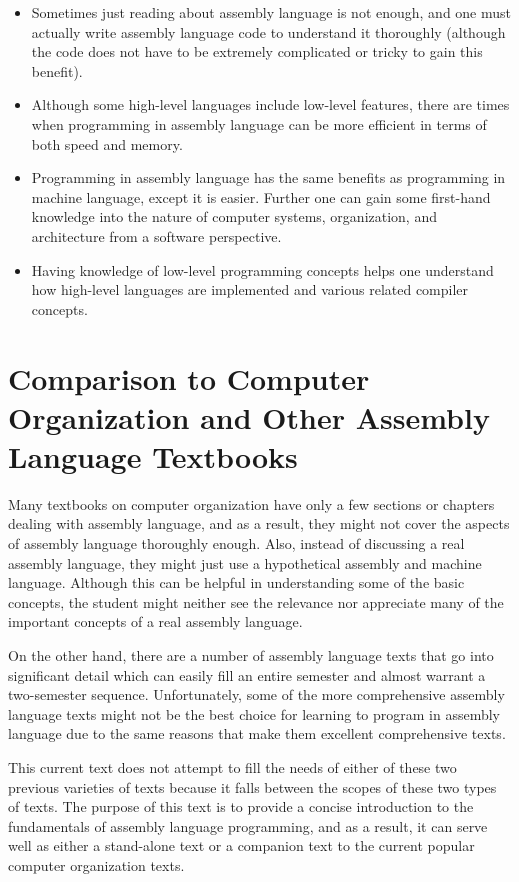 \documentclass[10pt]{article}
\begin{document}
\begin{itemize}
  \item Sometimes just reading about assembly language is not enough, and one must actually write assembly language code to understand it thoroughly (although the code does not have to be extremely complicated or tricky to gain this benefit).
  \item Although some high-level languages include low-level features, there are times when programming in assembly language can be more efficient in terms of both speed and memory.
  \item Programming in assembly language has the same benefits as programming in machine language, except it is easier. Further one can gain some first-hand\\

knowledge into the nature of computer systems, organization, and architecture from a software perspective.
  \item Having knowledge of low-level programming concepts helps one understand how high-level languages are implemented and various related compiler concepts.
\end{itemize}

\section*{Comparison to Computer Organization and Other Assembly Language Textbooks}
Many textbooks on computer organization have only a few sections or chapters dealing with assembly language, and as a result, they might not cover the aspects of assembly language thoroughly enough. Also, instead of discussing a real assembly language, they might just use a hypothetical assembly and machine language. Although this can be helpful in understanding some of the basic concepts, the student might neither see the relevance nor appreciate many of the important concepts of a real assembly language.

On the other hand, there are a number of assembly language texts that go into significant detail which can easily fill an entire semester and almost warrant a two-semester sequence. Unfortunately, some of the more comprehensive assembly language texts might not be the best choice for learning to program in assembly language due to the same reasons that make them excellent comprehensive texts.

This current text does not attempt to fill the needs of either of these two previous varieties of texts because it falls between the scopes of these two types of texts. The purpose of this text is to provide a concise introduction to the fundamentals of assembly language programming, and as a result, it can serve well as either a stand-alone text or a companion text to the current popular computer organization texts.
\end{document}
